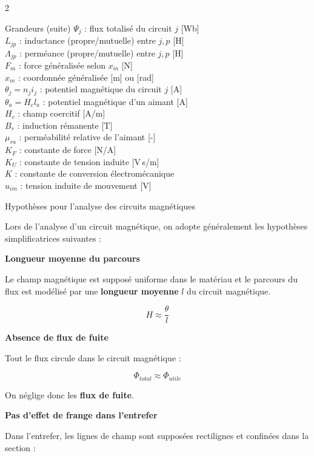 \documentclass[10pt,a4paper]{article}
\begin{document}
\begin{multicols}{2}
\begin{metbox}{Grandeurs (suite)}
$\Psi_j$ : flux totalisé du circuit $j$ [Wb] \\
$L_{jp}$ : inductance (propre/mutuelle) entre $j,p$ [H] \\
$\Lambda_{jp}$ : perméance (propre/mutuelle) entre $j,p$ [H] \\
$F_m$ : force généralisée selon $x_m$ [N] \\
$x_m$ : coordonnée généralisée [m] ou [rad] \\
$\theta_j=n_ji_j$ : potentiel magnétique du circuit $j$ [A] \\
$\theta_a=H_cl_a$ : potentiel magnétique d'un aimant [A] \\
$H_c$ : champ coercitif [A/m] \\
$B_r$ : induction rémanente [T] \\
$\mu_{ra}$ : perméabilité relative de l'aimant [-] \\
$K_F$ : constante de force [N/A] \\
$K_U$ : constante de tension induite [V\,s/m] \\
$K$ : constante de conversion électromécanique \\
$u_{im}$ : tension induite de mouvement [V]

\end{metbox}

\begin{metbox}{Hypothèses pour l'analyse des circuits magnétiques}

Lors de l'analyse d'un circuit magnétique, on adopte généralement
les hypothèses simplificatrices suivantes :

\medskip
\textbf{Longueur moyenne du parcours}

Le champ magnétique est supposé uniforme dans le matériau et
le parcours du flux est modélisé par une \textbf{longueur moyenne}
$l$ du circuit magnétique.

\[
H \approx \frac{\theta}{l}
\]

\medskip
\textbf{Absence de flux de fuite}

Tout le flux circule dans le circuit magnétique :

\[
\Phi_{total} \approx \Phi_{utile}
\]

On néglige donc les \textbf{flux de fuite}.

\medskip
\textbf{Pas d'effet de frange dans l'entrefer}

Dans l'entrefer, les lignes de champ sont supposées
rectilignes et confinées dans la section :


\end{metbox}
\end{multicols}
\end{document}
